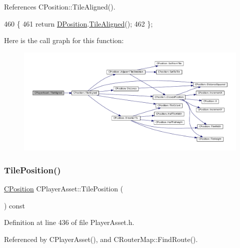 References C\+Position\+::\+Tile\+Aligned().


\begin{DoxyCode}
460                                 \{
461             \textcolor{keywordflow}{return} \hyperlink{classCPlayerAsset_aa9f53c009b181c7c5647c6b03776a04c}{DPosition}.\hyperlink{classCPosition_abe4ef039d9bbf51cd542167b5a0cd88e}{TileAligned}();  
462         \};
\end{DoxyCode}
Here is the call graph for this function\+:\nopagebreak
\begin{figure}[H]
\begin{center}
\leavevmode
\includegraphics[width=350pt]{classCPlayerAsset_aaaea60176986f3e4f464bf5cec056521_cgraph}
\end{center}
\end{figure}
\hypertarget{classCPlayerAsset_a23354232e5585574bc8e12c1fdb37ad9}{}\label{classCPlayerAsset_a23354232e5585574bc8e12c1fdb37ad9} 
\subsubsection{\texorpdfstring{Tile\+Position()}{TilePosition()}\hspace{0.1cm}{\footnotesize\ttfamily [1/2]}}
{\footnotesize\ttfamily \hyperlink{classCPosition}{C\+Position} C\+Player\+Asset\+::\+Tile\+Position (\begin{DoxyParamCaption}{ }\end{DoxyParamCaption}) const\hspace{0.3cm}{\ttfamily [inline]}}



Definition at line 436 of file Player\+Asset.\+h.



Referenced by C\+Player\+Asset(), and C\+Router\+Map\+::\+Find\+Route().


